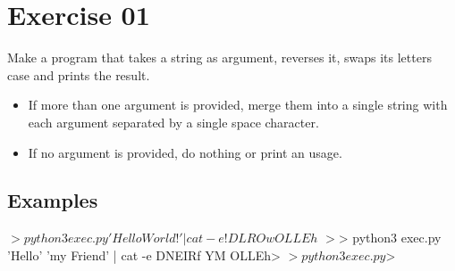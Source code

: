 \chapter{Exercise 01}
\makeheaderfilesforbidden
\newline
Make a program that takes a string as argument, reverses it, swaps its letters case and prints the result.

\begin{itemize}
	\item If more than one argument is provided, merge them into a single string with each argument separated by a single space character.
	\item If no argument is provided, do nothing or print an usage.
\end{itemize}
\section*{Examples}

\begin{42console}
$> python3 exec.py 'Hello World!' | cat -e
!DLROw OLLEh$
$>
$> python3 exec.py 'Hello' 'my Friend' | cat -e
DNEIRf YM OLLEh$
$>
$> python3 exec.py
$>
\end{42console}
